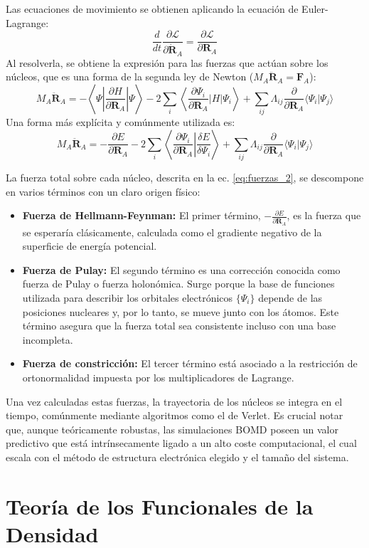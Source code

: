 Las ecuaciones de movimiento se obtienen aplicando la ecuación de Euler-Lagrange:
\begin{equation}
    \frac{d}{dt} \frac{\partial \mathcal{L}}{\partial \dot{\mathbf{R}}_A} = \frac{\partial \mathcal{L}}{\partial \mathbf{R}_A}
    \label{eq:euler_lagrange} 
\end{equation}
Al resolverla, se obtiene la expresión para las fuerzas que actúan sobre los núcleos, que es una forma de la segunda ley de Newton ($M_A\ddot{\mathbf{R}}_A = \mathbf{F}_A$):
\begin{equation}
    M_A \ddot{\mathbf{R}}_A = -\left\langle\Psi\left|\frac{\partial H}{\partial \mathbf{R}_A}\right|\Psi\right\rangle - 2 \sum_{i} \left\langle\frac{\partial \Psi_i}{\partial \mathbf{R}_A}\left|H\right|\Psi_i\right\rangle + \sum_{ij} \Lambda_{ij} \frac{\partial}{\partial \mathbf{R}_A} \langle\Psi_i|\Psi_j\rangle
    \label{eq:fuerzas_1} 
\end{equation}
Una forma más explícita y comúnmente utilizada es:
\begin{equation}
    M_A \ddot{\mathbf{R}}_A = -\frac{\partial E}{\partial \mathbf{R}_A} - 2 \sum_i \left\langle\frac{\partial \Psi_i}{\partial \mathbf{R}_A}\left|\frac{\delta E}{\delta \Psi_i}\right.\right\rangle + \sum_{ij} \Lambda_{ij} \frac{\partial}{\partial \mathbf{R}_A} \langle\Psi_i|\Psi_j\rangle
    \label{eq:fuerzas_2}
\end{equation}

La fuerza total sobre cada núcleo, descrita en la ec. \eqref{eq:fuerzas_2}, se descompone en varios términos con un claro origen físico:
\begin{itemize}
    \item \textbf{Fuerza de Hellmann-Feynman:} El primer término, $-\frac{\partial E}{\partial \mathbf{R}_A}$, es la fuerza que se esperaría clásicamente, calculada como el gradiente negativo de la superficie de energía potencial.
    \item \textbf{Fuerza de Pulay:} El segundo término es una corrección conocida como fuerza de Pulay o fuerza holonómica. Surge porque la base de funciones utilizada para describir los orbitales electrónicos $\{\Psi_i\}$ depende de las posiciones nucleares y, por lo tanto, se mueve junto con los átomos. Este término asegura que la fuerza total sea consistente incluso con una base incompleta.
    \item \textbf{Fuerza de constricción:} El tercer término está asociado a la restricción de ortonormalidad impuesta por los multiplicadores de Lagrange.
\end{itemize}

Una vez calculadas estas fuerzas, la trayectoria de los núcleos se integra en el tiempo, comúnmente mediante algoritmos como el de Verlet. Es crucial notar que, aunque teóricamente robustas, las simulaciones BOMD poseen un valor predictivo que está intrínsecamente ligado a un alto coste computacional, el cual escala con el método de estructura electrónica elegido y el tamaño del sistema.

\section{Teoría de los Funcionales de la Densidad}

